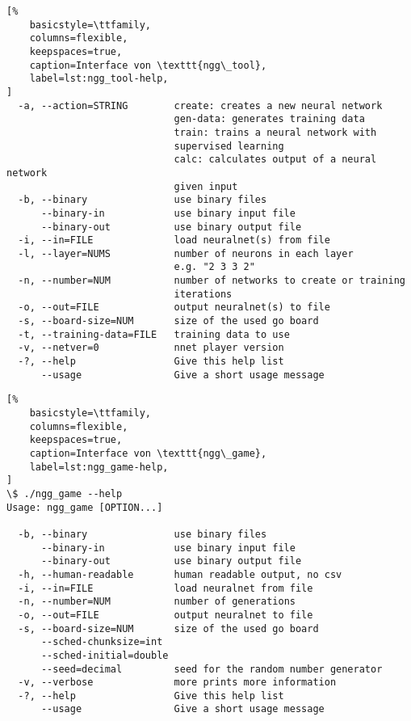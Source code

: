 \begin{appendices}
\begin{lstlisting}[%
    basicstyle=\ttfamily,
    columns=flexible,
    keepspaces=true,
    caption=Interface von \texttt{ngg\_tool},
    label=lst:ngg_tool-help,
]
  -a, --action=STRING        create: creates a new neural network
                             gen-data: generates training data
                             train: trains a neural network with
                             supervised learning
                             calc: calculates output of a neural network
                             given input
  -b, --binary               use binary files
      --binary-in            use binary input file
      --binary-out           use binary output file
  -i, --in=FILE              load neuralnet(s) from file
  -l, --layer=NUMS           number of neurons in each layer
                             e.g. "2 3 3 2"
  -n, --number=NUM           number of networks to create or training
                             iterations
  -o, --out=FILE             output neuralnet(s) to file
  -s, --board-size=NUM       size of the used go board
  -t, --training-data=FILE   training data to use
  -v, --netver=0             nnet player version
  -?, --help                 Give this help list
      --usage                Give a short usage message
\end{lstlisting}

\begin{lstlisting}[%
    basicstyle=\ttfamily,
    columns=flexible,
    keepspaces=true,
    caption=Interface von \texttt{ngg\_game},
    label=lst:ngg_game-help,
]
\$ ./ngg_game --help
Usage: ngg_game [OPTION...]

  -b, --binary               use binary files
      --binary-in            use binary input file
      --binary-out           use binary output file
  -h, --human-readable       human readable output, no csv
  -i, --in=FILE              load neuralnet from file
  -n, --number=NUM           number of generations
  -o, --out=FILE             output neuralnet to file
  -s, --board-size=NUM       size of the used go board
      --sched-chunksize=int
      --sched-initial=double
      --seed=decimal         seed for the random number generator
  -v, --verbose              more prints more information
  -?, --help                 Give this help list
      --usage                Give a short usage message
\end{lstlisting}

\end{appendices}
